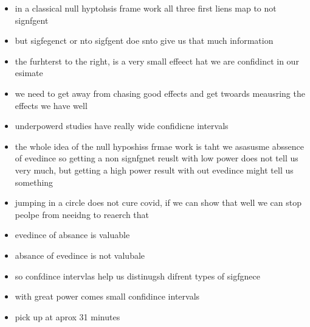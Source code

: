 \documentclass{article}
\begin{document}
\begin{itemize}
\item in a classical null hyptohsis frame work all three first liens map to not signfgent 
\item but sigfegenct or nto sigfgent doe snto give us that much information 
\item the furhterst to the right, is a very small effeect hat we are confidinct in our esimate 
\item we need to get away from chasing good effects and get twoards meausring the effects we have well
\item underpowerd studies have really wide confidicne intervals 
\item the whole idea of the null hyposhiss frmae work is taht we asasusme abssence of evedince so getting a non signfgnet reuslt with low power does not tell us very much, but getting a high power result with out evedince might tell us something 
\item jumping in a circle does not cure covid, if we can show that well we can stop peolpe from neeidng to reaerch that 
\item evedince of absance is valuable
\item  absance of evedince is not valubale
\item so confdince intervlas help us distinugsh difrent types of sigfgnece
\item with great power comes small confidince intervals 
\item pick up at aprox 31 minutes
\end{itemize}
\end{document}

